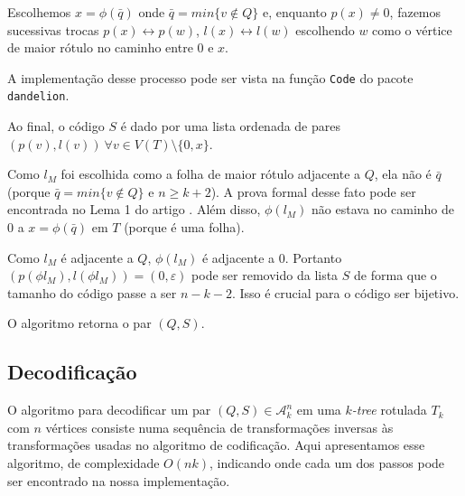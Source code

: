 \begin{algorithm}
\begin{step}
    Escolhemos $x = \phi(\bar{q})$ onde $\bar{q} = min\{v \not \in Q\}$ e, enquanto $p(x) \neq 0$, fazemos sucessivas trocas $p(x) \leftrightarrow p(w)$, $l(x) \leftrightarrow l(w)$ escolhendo $w$ como o vértice de maior rótulo no caminho entre $0$ e $x$.

    A implementação desse processo pode ser vista na função {\tt Code} do pacote {\tt dandelion}.

    Ao final, o código $S$ é dado por uma lista ordenada de pares $(p(v), l(v)) \  \forall v \in V(T) \setminus \{0, x\}$.
  \end{step}

  \begin{step}
    Como $l_M$ foi escolhida como a folha de maior rótulo adjacente a $Q$, ela não é $\bar{q}$ (porque $\bar{q} = min\{v \not \in Q\}$ e $n \geq k + 2$). A prova formal desse fato pode ser encontrada no Lema 1 do artigo \cite{caminiti}. Além disso, $\phi(l_M)$ não estava no caminho de $0$ a $x = \phi(\bar{q})$ em $T$ (porque é uma folha).

    Como $l_M$ é adjacente a $Q$, $\phi(l_M)$ é adjacente a $0$. Portanto $(p(\phi{l_M}), l(\phi{l_M})) = (0, \varepsilon)$ pode ser removido da lista $S$ de forma que o tamanho do código passe a ser $n - k - 2$. Isso é crucial para o código ser bijetivo.

    O algoritmo retorna o par $(Q, S)$.
  \end{step}
\end{algorithm}

\subsection{Decodificação}
\label{subsec:decodificacao}

O algoritmo para decodificar um par $(Q, S) \in \mathcal{A}^n_k$ em uma \emph{$k$-tree} rotulada $T_k$ com $n$ vértices consiste numa sequência de transformações inversas às transformações usadas no algoritmo de codificação. Aqui apresentamos esse algoritmo, de complexidade $O(nk)$, indicando onde cada um dos passos pode ser encontrado na nossa implementação.

